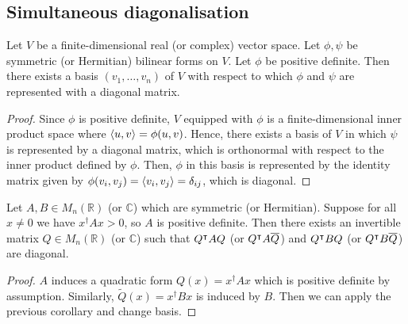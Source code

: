 \subsection{Simultaneous diagonalisation}
\begin{corollary}
	Let \( V \) be a finite-dimensional real (or complex) vector space.
	Let \( \phi, \psi \) be symmetric (or Hermitian) bilinear forms on \( V \).
	Let \( \phi \) be positive definite.
	Then there exists a basis \( (v_1, \dots, v_n) \) of \( V \) with respect to which \( \phi \) and \( \psi \) are represented with a diagonal matrix.
\end{corollary}
\begin{proof}
	Since \( \phi \) is positive definite, \( V \) equipped with \( \phi \) is a finite-dimensional inner product space where \( \left\langle{u,v}\right\rangle = \phi(u,v) \).
	Hence, there exists a basis of \( V \) in which \( \psi \) is represented by a diagonal matrix, which is orthonormal with respect to the inner product defined by \( \phi \).
	Then, \( \phi \) in this basis is represented by the identity matrix given by \( \phi(v_i, v_j) = \left\langle{v_i, v_j}\right\rangle = \delta_{ij} \), which is diagonal.
\end{proof}
\begin{corollary}
	Let \( A, B \in M_n(\mathbb R) \) (or \( \mathbb C \)) which are symmetric (or Hermitian).
	Suppose for all \( x \neq 0 \) we have \( x^\dagger A x > 0 \), so \( A \) is positive definite.
	Then there exists an invertible matrix \( Q \in M_n(\mathbb R) \) (or \( \mathbb C \)) such that \( Q^\intercal A Q \) (or \( Q^\intercal A \overline{Q} \)) and \( Q^\intercal B Q \) (or \( Q^\intercal B \overline{Q} \)) are diagonal.
\end{corollary}
\begin{proof}
	\( A \) induces a quadratic form \( Q(x) = x^\dagger A x \) which is positive definite by assumption.
	Similarly, \( \widetilde Q(x) = x^\dagger B x \) is induced by \( B \).
	Then we can apply the previous corollary and change basis.
\end{proof}
